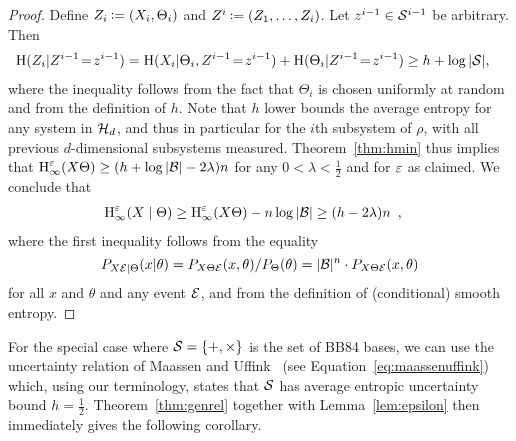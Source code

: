 \begin{proof}
Define $Z_i \assign (X_i,\Theta_i)$ and $\prei[i]{Z} \assign (Z_1,\ldots,Z_i)$. Let 
$\prei[i-1]{z}\in \bset^{i-1}$ be arbitrary. Then
\begin{align*} 
\H(Z_i | \prei[i-1]{Z}\!=\!\prei[i-1]{z}) &= \H(X_i | \Theta_i, \prei[i-1]{Z}\!=\!\prei[i-1]{z})
+ \H(\Theta_i | \prei[i-1]{Z}\!=\!\prei[i-1]{z}) \geq h + \log{|\bset|},
\end{align*}
where the inequality follows from the fact that $\Theta_i$ is chosen
uniformly at random and from the definition of $h$. Note that $h$
lower bounds the average entropy for any system in $\cH_d$, 
and thus in particular for the $i$th subsystem 
of $\rho$, with all
previous $d$-dimensional subsystems measured.  
Theorem~\ref{thm:hmin} thus implies that $\hie{\varepsilon}{X \Theta} \geq (h+\log|{\cal B}| - 2\lambda) n$ for any $0 < \lambda < \frac12$ and for $\eps$ as claimed. We conclude that 
\begin{align*}
\hie{\varepsilon}{X\mid \Theta}
&\geq \hie{\varepsilon}{X \Theta} - n\log|{\cal B}| \geq (h - 2 \lambda)n \enspace ,
\end{align*}
where the first inequality follows from the equality 
$$
P_{X\ev|\Theta}(x|\theta) = P_{X \Theta \ev}(x, \theta)/P_{\Theta}(\theta) = |{\cal B}|^n \cdot P_{X \Theta \ev}(x, \theta)
$$
for all $x$ and $\theta$ and any event $\ev$, and from the definition of (conditional) smooth entropy.
\end{proof}


For the special case where $\bset=\{+,\times\}$ is the set of BB84
bases, we can use the uncertainty relation of Maassen and
Uffink~\cite{MU88} (see Equation~\eqref{eq:maassenuffink}) which, using our
terminology, states that 
$\bset$ has average entropic uncertainty bound $h =
\frac12$.  Theorem~\ref{thm:genrel} together with
Lemma~\ref{lem:epsilon} then immediately gives the
following corollary.

